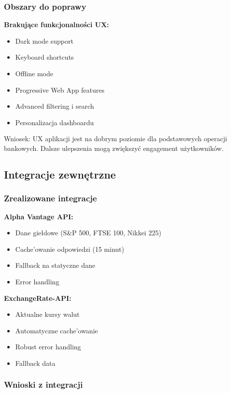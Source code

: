 \documentclass[12pt,a4paper]{article}
\begin{document}
    \subsubsection{Obszary do poprawy}

    \textbf{Brakujące funkcjonalności UX:}
    \begin{itemize}
        \item Dark mode support
        \item Keyboard shortcuts
        \item Offline mode
        \item Progressive Web App features
        \item Advanced filtering i search
        \item Personalizacja dashboardu
    \end{itemize}

    Wniosek: UX aplikacji jest na dobrym poziomie dla podstawowych operacji bankowych. Dalsze ulepszenia mogą zwiększyć engagement użytkowników.

    \subsection{Integracje zewnętrzne}

    \subsubsection{Zrealizowane integracje}

    \textbf{Alpha Vantage API:}
    \begin{itemize}
        \item Dane giełdowe (S\&P 500, FTSE 100, Nikkei 225)
        \item Cache'owanie odpowiedzi (15 minut)
        \item Fallback na statyczne dane
        \item Error handling
    \end{itemize}

    \textbf{ExchangeRate-API:}
    \begin{itemize}
        \item Aktualne kursy walut
        \item Automatyczne cache'owanie
        \item Robust error handling
        \item Fallback data
    \end{itemize}

    \subsubsection{Wnioski z integracji}
\end{document}

